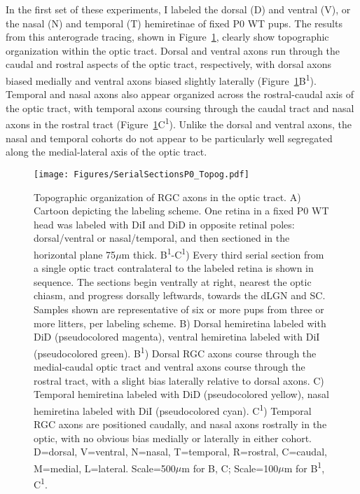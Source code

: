 In the first set of these experiments, I labeled the dorsal (D) and ventral (V), or the nasal (N) and temporal (T) hemiretinae of fixed P0 WT pups.
The results from this anterograde tracing, shown in Figure~\ref{Figures/SerialSectionsP0_Topog}, clearly show topographic organization within the optic tract.
Dorsal and ventral axons run through the caudal and rostral aspects of the optic tract, respectively, with dorsal axons biased medially and ventral axons biased slightly laterally (Figure~\ref{Figures/SerialSectionsP0_Topog}B\textsuperscript{1}).
Temporal and nasal axons also appear organized across the rostral-caudal axis of the optic tract, with temporal axons coursing through the caudal tract and nasal axons in the rostral tract (Figure~\ref{Figures/SerialSectionsP0_Topog}C\textsuperscript{1}).
Unlike the dorsal and ventral axons, the nasal and temporal cohorts do not appear to be particularly well segregated along the medial-lateral axis of the optic tract.
\begin{figure}[hbtp]
    \begin{center}
        \texttt{[image: Figures/SerialSectionsP0\_Topog.pdf]}
        \caption[Topographic organization of RGC axons in the optic tract.]
        {Topographic organization of RGC axons in the optic tract.
        A) Cartoon depicting the labeling scheme.
        One retina in a fixed P0 WT head was labeled with DiI and DiD in opposite retinal poles: dorsal/ventral or nasal/temporal, and then sectioned in the horizontal plane 75$\mu$m thick.
        B\textsuperscript{1}-C\textsuperscript{1}) Every third serial section from a single optic tract contralateral to the labeled retina is shown in sequence.
        The sections begin ventrally at right, nearest the optic chiasm, and progress dorsally leftwards, towards the dLGN and SC.
        Samples shown are representative of six or more pups from three or more litters, per labeling scheme. %
        B) Dorsal hemiretina labeled with DiD (pseudocolored magenta), ventral hemiretina labeled with DiI (pseudocolored green).
        B\textsuperscript{1}) Dorsal RGC axons course through the medial-caudal optic tract and ventral axons course through the rostral tract, with a slight bias laterally relative to dorsal axons.
        C) Temporal hemiretina labeled with DiD (pseudocolored yellow), nasal hemiretina labeled with DiI (pseudocolored cyan).
        C\textsuperscript{1}) Temporal RGC axons are positioned caudally, and nasal axons rostrally in the optic, with no obvious bias medially or laterally in either cohort.
        D=dorsal, V=ventral, N=nasal, T=temporal, R=rostral, C=caudal, M=medial, L=lateral. Scale=500$\mu$m for B, C; Scale=100$\mu$m for B\textsuperscript{1}, C\textsuperscript{1}.}
        \label{Figures/SerialSectionsP0_Topog}
    \end{center}
\end{figure}

